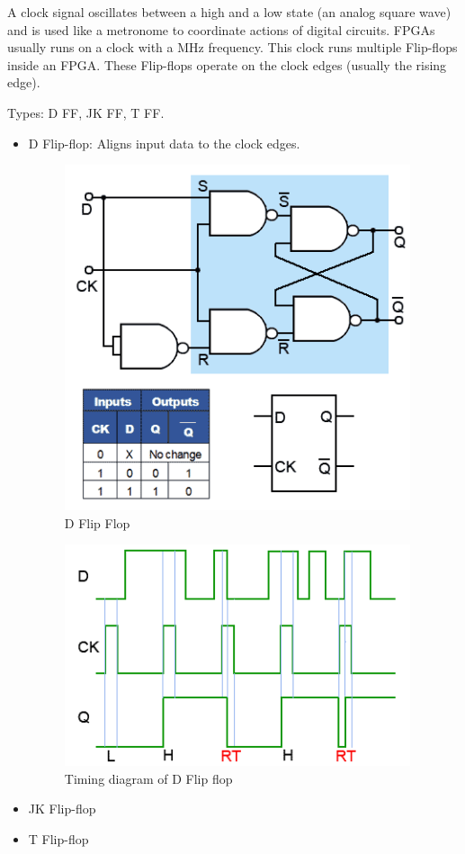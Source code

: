 A clock signal oscillates between a high and a low state (an analog square wave) and is used like a metronome to coordinate actions of digital circuits. FPGAs usually runs on a clock with a MHz frequency. This clock runs multiple Flip-flops inside an FPGA. These Flip-flops operate on the clock edges (usually the rising edge).

Types: D FF, JK FF, T FF.

\begin{itemize}
	\item D Flip-flop: Aligns input data to the clock edges.
	\begin{figure}[H]
        \begin{center}
            \includegraphics[width=4in]{images/D-FF.png}
            \caption{D Flip Flop}
            \label{DFF}
        \end{center}
    \end{figure}

    \begin{figure}[H]
        \begin{center}
            \includegraphics[width=4in]{images/D-FF-Timing.png}
            \caption{Timing diagram of D Flip flop}
            \label{DFFTime}
        \end{center}
    \end{figure}

	\item JK Flip-flop
	\item T Flip-flop
\end{itemize}

